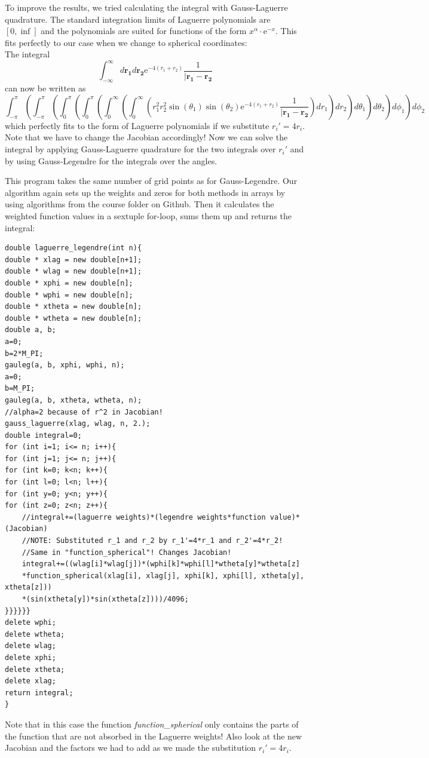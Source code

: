 \documentclass[10pt,a4paper]{article}
\begin{document}
To improve the results, we tried calculating the integral with Gauss-Laguerre quadrature. The standard integration limits of Laguerre polynomials are $[0,\inf]$ and the polynomials are suited for functions of the form $x^\alpha\cdot \mathrm{e}^{-x}$. This fits perfectly to our case when we change to spherical coordinates:\\
The integral
\begin{equation}
\int_{-\infty}^{\infty} d\mathbf{r_1}d\mathbf{r_2}\mathrm{e}^{-4(r_1+r_2)}\frac{1}{|\mathbf{r_1}-\mathbf{r_2}}
\end{equation}
can now be written as
\begin{equation}
\int_{-\pi}^{\pi}\left(\int_{-\pi}^{\pi}\left(\int_{0}^{\pi}\left(\int_{0}^{\pi}\left(\int_{0}^{\infty}\left(\int_{0}^{\infty}\left(r_1^2r_2^2\sin(\theta_1)\sin(\theta_2)\mathrm{e}^{-4(r_1+r_2)}\frac{1}{|\mathbf{r_1}-\mathbf{r_2}}\right)dr_1\right)dr_2\right)d\theta_1\right)d\theta_2\right)d\phi_1\right)d\phi_2
\end{equation}
which perfectly fits to the form of Laguerre polynomials if we substitute $r_i'=4r_i$. Note that we have to change the Jacobian accordingly! Now we can solve the integral by applying Gauss-Laguerre quadrature for the two integrals over $r_i'$ and by using Gauss-Legendre for the integrals over the angles.

This program takes the same number of grid points as for Gauss-Legendre. Our algorithm again sets up the weights and zeros for both methods in arrays by using algorithms from the course folder on Github. Then it calculates the weighted function values in a sextuple for-loop, sums them up and returns the integral:
\begin{lstlisting}
double laguerre_legendre(int n){
double * xlag = new double[n+1];
double * wlag = new double[n+1];
double * xphi = new double[n];
double * wphi = new double[n];
double * xtheta = new double[n];
double * wtheta = new double[n];
double a, b;
a=0;
b=2*M_PI;
gauleg(a, b, xphi, wphi, n);
a=0;
b=M_PI;
gauleg(a, b, xtheta, wtheta, n);
//alpha=2 because of r^2 in Jacobian!
gauss_laguerre(xlag, wlag, n, 2.);
double integral=0;
for (int i=1; i<= n; i++){
for (int j=1; j<= n; j++){
for (int k=0; k<n; k++){
for (int l=0; l<n; l++){
for (int y=0; y<n; y++){
for (int z=0; z<n; z++){
	//integral+=(laguerre weights)*(legendre weights*function value)*(Jacobian)
	//NOTE: Substituted r_1 and r_2 by r_1'=4*r_1 and r_2'=4*r_2!
	//Same in "function_spherical"! Changes Jacobian!
	integral+=((wlag[i]*wlag[j])*(wphi[k]*wphi[l]*wtheta[y]*wtheta[z]
	*function_spherical(xlag[i], xlag[j], xphi[k], xphi[l], xtheta[y], xtheta[z]))
	*(sin(xtheta[y])*sin(xtheta[z])))/4096;
}}}}}}
delete wphi;
delete wtheta;
delete wlag;
delete xphi;
delete xtheta;
delete xlag;
return integral;
}
\end{lstlisting}
Note that in this case the function \emph{function\_spherical} only contains the parts of the function that are not absorbed in the Laguerre weights! Also look at the new Jacobian and the factors we had to add as we made the substitution $r_i'=4r_i$.
\end{document}
